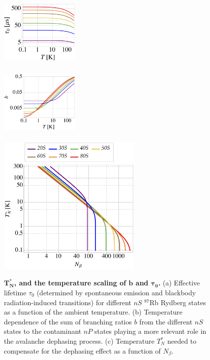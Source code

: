 \documentclass[10pt,twocolumn]{article}
\begin{document}
\begin{figure}[]
\begin{minipage}[c][4.5cm][t]{.24\textwidth}
  \vspace*{\fill}
  \centering
  \includegraphics[width=3.8cm,height=3.2cm]{tauloglog.png}
  \subcaption{}
  \label{fig:cthcal1_4}
\end{minipage}%
\begin{minipage}[c][4.5cm][t]{.24\textwidth}
  \vspace*{\fill}
  \centering
  \includegraphics[width=3.8cm,height=3.3cm]{bloglog.png}
  \subcaption{}
  \label{fig:cthcal2_4}
\end{minipage}%
\vspace*{1.9cm}
\begin{minipage}[c][6cm][b]{.46\textwidth}
  \centering
  \includegraphics[width=7.0cm,height=6.8cm]{TvsNbloglog.png}
  \subcaption{}
  \label{fig:cthcal3_4}
\end{minipage}
\caption{\textbf{$\bm{T^*_N}$, and the temperature  scaling of $\bm{b}$ and $\bm{\tau_0}$.} (a) Effective lifetime $\tau_0$ (determined by spontaneous emission and blackbody radiation-induced transitions) for different $nS$ $^{87}$Rb Rydberg states as a function of the ambient temperature. (b) Temperature dependence of the sum of branching ratios $b$ from the different $nS$ states to the contaminant $nP$ states playing a more relevant role in the avalanche dephasing process. (c)  Temperature $T^*_N$ needed to compensate for the dephasing effect as a function of $N_{\beta}$.}\label{fig:cthcal_4}
\end{figure}
\end{document}
